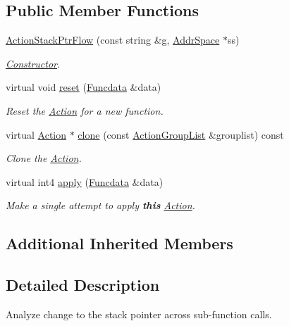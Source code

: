 \subsection*{Public Member Functions}
\begin{DoxyCompactItemize}
\item 
\mbox{\hyperlink{class_action_stack_ptr_flow_ade2bdc30e166fcb9f5e317bd7b9bae89}{Action\+Stack\+Ptr\+Flow}} (const string \&g, \mbox{\hyperlink{class_addr_space}{Addr\+Space}} $\ast$ss)
\begin{DoxyCompactList}\small\item\em \mbox{\hyperlink{class_constructor}{Constructor}}. \end{DoxyCompactList}\item 
virtual void \mbox{\hyperlink{class_action_stack_ptr_flow_a2baae3d78de2308e628b17ed3db8a625}{reset}} (\mbox{\hyperlink{class_funcdata}{Funcdata}} \&data)
\begin{DoxyCompactList}\small\item\em Reset the \mbox{\hyperlink{class_action}{Action}} for a new function. \end{DoxyCompactList}\item 
virtual \mbox{\hyperlink{class_action}{Action}} $\ast$ \mbox{\hyperlink{class_action_stack_ptr_flow_a82a95a85172576abdfa446a3faed3ff4}{clone}} (const \mbox{\hyperlink{class_action_group_list}{Action\+Group\+List}} \&grouplist) const
\begin{DoxyCompactList}\small\item\em Clone the \mbox{\hyperlink{class_action}{Action}}. \end{DoxyCompactList}\item 
virtual int4 \mbox{\hyperlink{class_action_stack_ptr_flow_a50ab249d10eef25f05e5e8de38786f7b}{apply}} (\mbox{\hyperlink{class_funcdata}{Funcdata}} \&data)
\begin{DoxyCompactList}\small\item\em Make a single attempt to apply {\bfseries{this}} \mbox{\hyperlink{class_action}{Action}}. \end{DoxyCompactList}\end{DoxyCompactItemize}
\subsection*{Additional Inherited Members}


\subsection{Detailed Description}
Analyze change to the stack pointer across sub-\/function calls. 

